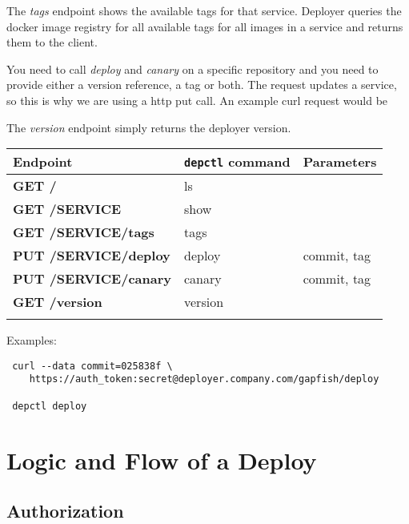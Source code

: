 The \emph{tags} endpoint shows
the available tags for that service. Deployer queries the docker image registry for all
available tags for all images in a service and returns them to the client.

You need to call \emph{deploy} and \emph{canary} on a specific repository and you
need to provide either a version reference, a tag or both. The request updates a service, so
this is why we are using a http put call. An example curl request would be

The \emph{version}
endpoint simply returns the deployer version.

\begin{table}[!htbp]
  \begin{tabular}{ l|l|l }
    Endpoint & \texttt{depctl} command & Parameters \\
    \hline \hline
    \textbf{GET /} & ls & \\
    \textbf{GET /SERVICE} & show & \\
    \textbf{GET /SERVICE/tags} & tags & \\
    \textbf{PUT /SERVICE/deploy} & deploy & commit, tag \\
    \textbf{PUT /SERVICE/canary} & canary & commit, tag \\
    \textbf{GET /version} & version & \\
    \multicolumn{3}{l}{} %
  \end{tabular}

  Examples:

\begin{verbatim}
 curl --data commit=025838f \
    https://auth_token:secret@deployer.company.com/gapfish/deploy

 depctl deploy
\end{verbatim}
\end{table}

\section{Logic and Flow of a Deploy}

\subsection{Authorization}

